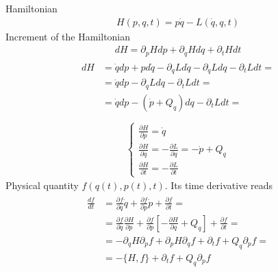 \documentclass[letterpaper,10pt,english]{jupyterBook}
\begin{document}
\sphinxAtStartPar
Hamiltonian
\begin{equation*}
\begin{split}H(p,q,t) = p \dot{q} - L(\dot{q}, q, t)\end{split}
\end{equation*}
\sphinxAtStartPar
Increment of the Hamiltonian
\begin{equation*}
\begin{split}dH = \partial_p H dp + \partial_q H dq + \partial_t H dt \end{split}
\end{equation*}\begin{equation*}
\begin{split}\begin{aligned}
  dH & = \dot{q} dp + p d \dot{q} - \partial_{\dot{q}} L d \dot{q} - \partial_{q} L d q - \partial_t L d t = \\
     & = \dot{q} dp - \partial_{q} L d q - \partial_t L d t = \\
     & = \dot{q} dp - \left( \dot{p} + Q_q \right) d q - \partial_t L d t = \\
\end{aligned}\end{split}
\end{equation*}\begin{equation*}
\begin{split}\begin{cases}
  \frac{\partial H}{\partial p} = \dot{q} \\
  \frac{\partial H}{\partial q} = - \frac{\partial L}{\partial q} = - \dot{p} + Q_q \\
  \frac{\partial H}{\partial t} = - \frac{\partial L}{\partial t}
\end{cases}\end{split}
\end{equation*}
\sphinxAtStartPar
Physical quantity \(f(q(t), p(t), t)\). Its time derivative reads
\begin{equation*}
\begin{split}\begin{aligned}
\frac{d f}{dt}
  & = \frac{\partial f}{\partial q} \dot{q} + \frac{\partial f}{\partial p} \dot{p} + \frac{\partial f}{\partial t} = \\
  & = \frac{\partial f}{\partial q} \frac{\partial H}{\partial p} + \frac{\partial f}{\partial p} \left[ - \frac{\partial H}{\partial q} + Q_q \right] + \frac{\partial f}{\partial t} = \\
  & = - \partial_q H \partial_p f + \partial_p H \partial_q f + \partial_t f + Q_q \partial_p f = \\
  & = - \{ H, f \} + \partial_t f + Q_q \partial_p f
\end{aligned}\end{split}
\end{equation*}
\end{document}
